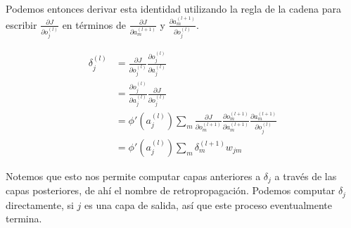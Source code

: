 Podemos entonces derivar esta identidad utilizando la regla de la cadena
para escribir $\frac{\partial J}{\partial o_j^{(l)}}$ en términos de
$\frac{\partial J}{\partial a_m^{(l+1)}}$ y $\frac{\partial a_m^{(l+1)}}{\partial o_j^{(l)}}$.

\begin{equation}
\begin{split}
  \delta_j^{(l)} &= \frac{\partial J}{\partial o_j^{(l)}} \frac{\partial o_j^{(l)}}{\partial a_j^{(l)}} \\
  &= \frac{\partial o_j^{(l)}}{\partial a_j^{(l)}} \frac{\partial J}{\partial o_j^{(l)}} \\
  &= \phi' (a_j^{(l)}) \sum_m \frac{\partial J}{\partial o_m^{(l+1)}} \frac{\partial o_m^{(l+1)}}{\partial a_m^{(l+1)}} \frac{\partial a_m^{(l+1)}}{\partial o_j^{(l)}} \\
  &= \phi'(a_j^{(l)}) \sum_m \delta_m^{(l+1)}w_{jm}
\end{split}
\end{equation}

Notemos que esto nos permite computar capas anteriores a $\delta_j$ a
través de las capas posteriores, de ahí el nombre de retropropagación.
Podemos computar $\delta_j$ directamente, si $j$ es una capa de salida,
así que este proceso eventualmente termina.
